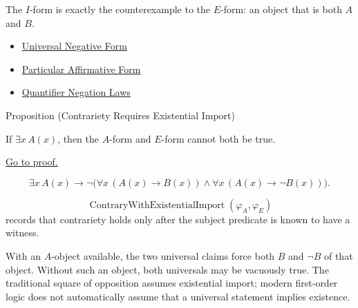 \begin{remark*}[Interpretation]
The \(I\)-form is exactly the counterexample to the \(E\)-form: an object that
is both \(A\) and \(B\).
\end{remark*}

\begin{dependencies}
\begin{itemize}
  \item \hyperref[def:categorical-e-form-predicate-logic]{Universal Negative Form}
  \item \hyperref[def:categorical-i-form-predicate-logic]{Particular Affirmative Form}
  \item \hyperref[thm:qneg]{Quantifier Negation Laws}
\end{itemize}
\end{dependencies}

\begin{propositionbox}{Proposition (Contrariety Requires Existential Import)}
\begin{proposition}
\label{prop:existential-import-contrariety-predicate-logic}
If \(\exists x\,A(x)\), then the \(A\)-form and \(E\)-form cannot both be true.

\noindent\hyperref[prf:existential-import-contrariety-predicate-logic]{Go to proof.}
\end{proposition}
\end{propositionbox}

\begin{remark*}
\[
\exists x\,A(x)
\to
\neg\bigl(
  \forall x\,(A(x)\to B(x))
  \land
  \forall x\,(A(x)\to \neg B(x))
\bigr).
\]
\end{remark*}

\begin{remark*}
\[
  \operatorname{ContraryWithExistentialImport}(\varphi_A,\varphi_E)
\] records
that contrariety holds only after the subject predicate is known to have a
witness.
\end{remark*}

\begin{remark*}[Interpretation]
With an \(A\)-object available, the two universal claims force both \(B\) and
\(\neg B\) of that object. Without such an object, both universals may be
vacuously true. The traditional square of opposition assumes existential
import; modern first-order logic does not automatically assume that a universal
statement implies existence.
\end{remark*}

